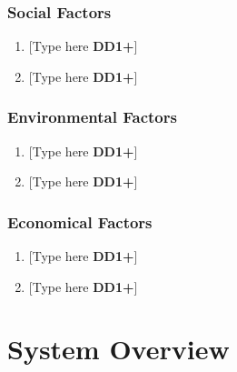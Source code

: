 \documentclass[letterpaper, 11pt]{article}
\begin{document}
\subsubsection{Social Factors}
\begin{enumerate}
    \item {[Type here \textbf{DD1+}]}
    \item {[Type here \textbf{DD1+}]}
\end{enumerate}

\subsubsection{Environmental Factors}
\begin{enumerate}
    \item {[Type here \textbf{DD1+}]}
    \item {[Type here \textbf{DD1+}]}
\end{enumerate}

\subsubsection{Economical Factors}
\begin{enumerate}
    \item {[Type here \textbf{DD1+}]}
    \item {[Type here \textbf{DD1+}]}
\end{enumerate}

\clearpage

\section{System Overview}
\end{document}
